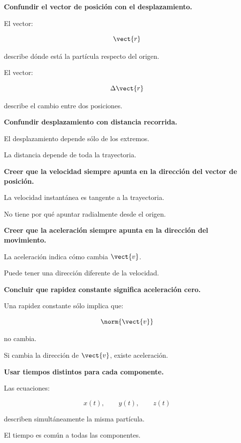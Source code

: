 \begin{errorfrecuente}
\textbf{Confundir el vector de posición con el desplazamiento.}

El vector:

\[
\vect{r}
\]

describe dónde está la partícula respecto del origen.

El vector:

\[
\Delta\vect{r}
\]

describe el cambio entre dos posiciones.
\end{errorfrecuente}


\begin{errorfrecuente}
\textbf{Confundir desplazamiento con distancia recorrida.}

El desplazamiento depende sólo de los extremos.

La distancia depende de toda la trayectoria.
\end{errorfrecuente}


\begin{errorfrecuente}
\textbf{Creer que la velocidad siempre apunta en la dirección del vector de
posición.}

La velocidad instantánea es tangente a la trayectoria.

No tiene por qué apuntar radialmente desde el origen.
\end{errorfrecuente}


\begin{errorfrecuente}
\textbf{Creer que la aceleración siempre apunta en la dirección del movimiento.}

La aceleración indica cómo cambia \(\vect{v}\).

Puede tener una dirección diferente de la velocidad.
\end{errorfrecuente}


\begin{errorfrecuente}
\textbf{Concluir que rapidez constante significa aceleración cero.}

Una rapidez constante sólo implica que:

\[
\norm{\vect{v}}
\]

no cambia.

Si cambia la dirección de \(\vect{v}\), existe aceleración.
\end{errorfrecuente}


\begin{errorfrecuente}
\textbf{Usar tiempos distintos para cada componente.}

Las ecuaciones:

\[
x(t),
\qquad
y(t),
\qquad
z(t)
\]

describen simultáneamente la misma partícula.

El tiempo es común a todas las componentes.
\end{errorfrecuente}


